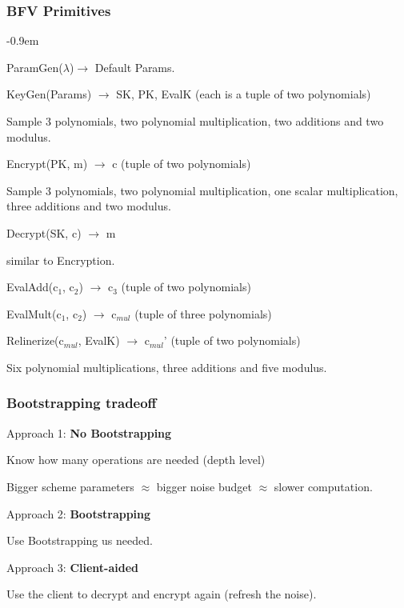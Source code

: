 \documentclass[10pt]{beamer}
\newcommand{\SubItem}[1]{
    {\setlength\itemindent{15pt} \item[-] #1}
}
\begin{document}
\begin{frame}
\frametitle{BFV Primitives}

\begin{itemize}\itemsep-0.9em
    \item ParamGen($\lambda$)$\rightarrow$ Default Params.
    \item KeyGen(Params) $\rightarrow$ SK, PK, EvalK (each is a tuple of two polynomials)
        \SubItem{ Sample 3 polynomials, two polynomial multiplication, two additions and two modulus.}
\pause
    \item Encrypt(PK, m) $\rightarrow$ c (tuple of two polynomials)
        \SubItem{ Sample 3 polynomials, two polynomial multiplication, one scalar multiplication, three additions and two modulus.}
    \item Decrypt(SK, c) $\rightarrow$ m
        \SubItem{ similar to Encryption.}
\pause
    \item EvalAdd(c$_1$, c$_2$) $\rightarrow$ c$_3$ (tuple of two polynomials)
    \item EvalMult(c$_1$, c$_2$) $\rightarrow$ c$_{mul}$ (tuple of three polynomials)
\pause
    \item Relinerize(c$_{mul}$, EvalK) $\rightarrow$ c$_{mul}$' (tuple of two polynomials)
        \SubItem{ Six polynomial multiplications, three additions and five modulus.}
\end{itemize}

\end{frame}




\begin{frame}
    \frametitle{Bootstrapping tradeoff}

    Approach 1: \textbf{No Bootstrapping}

    Know how many operations are needed (depth level)

    Bigger scheme parameters $\approx$ bigger noise budget $\approx$ slower computation.

\pause
    Approach 2: \textbf{Bootstrapping}

    Use Bootstrapping us needed.

\pause
    Approach 3: \textbf{Client-aided}

    Use the client to decrypt and encrypt again (refresh the noise).
\end{frame}
\end{document}
